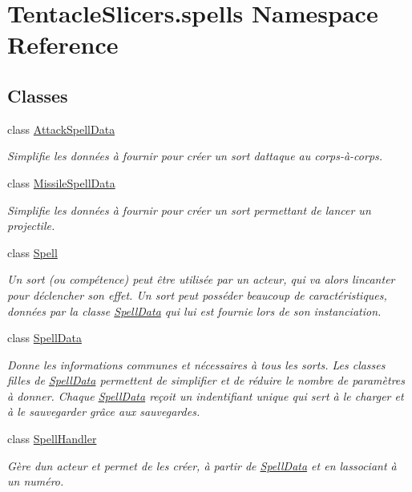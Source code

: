 \hypertarget{namespace_tentacle_slicers_1_1spells}{}\section{Tentacle\+Slicers.\+spells Namespace Reference}
\label{namespace_tentacle_slicers_1_1spells}
\subsection*{Classes}
\begin{DoxyCompactItemize}
\item 
class \hyperlink{class_tentacle_slicers_1_1spells_1_1_attack_spell_data}{Attack\+Spell\+Data}
\begin{DoxyCompactList}\small\item\em Simplifie les données à fournir pour créer un sort d\textquotesingle{}attaque au corps-\/à-\/corps. \end{DoxyCompactList}\item 
class \hyperlink{class_tentacle_slicers_1_1spells_1_1_missile_spell_data}{Missile\+Spell\+Data}
\begin{DoxyCompactList}\small\item\em Simplifie les données à fournir pour créer un sort permettant de lancer un projectile. \end{DoxyCompactList}\item 
class \hyperlink{class_tentacle_slicers_1_1spells_1_1_spell}{Spell}
\begin{DoxyCompactList}\small\item\em Un sort (ou compétence) peut être utilisée par un acteur, qui va alors l\textquotesingle{}incanter pour déclencher son effet. Un sort peut posséder beaucoup de caractéristiques, données par la classe \hyperlink{class_tentacle_slicers_1_1spells_1_1_spell_data}{Spell\+Data} qui lui est fournie lors de son instanciation. \end{DoxyCompactList}\item 
class \hyperlink{class_tentacle_slicers_1_1spells_1_1_spell_data}{Spell\+Data}
\begin{DoxyCompactList}\small\item\em Donne les informations communes et nécessaires à tous les sorts. Les classes filles de \hyperlink{class_tentacle_slicers_1_1spells_1_1_spell_data}{Spell\+Data} permettent de simplifier et de réduire le nombre de paramètres à donner. Chaque \hyperlink{class_tentacle_slicers_1_1spells_1_1_spell_data}{Spell\+Data} reçoit un indentifiant unique qui sert à le charger et à le sauvegarder grâce aux sauvegardes. \end{DoxyCompactList}\item 
class \hyperlink{class_tentacle_slicers_1_1spells_1_1_spell_handler}{Spell\+Handler}
\begin{DoxyCompactList}\small\item\em Gère d\textquotesingle{}un acteur et permet de les créer, à partir de \hyperlink{class_tentacle_slicers_1_1spells_1_1_spell_data}{Spell\+Data} et en l\textquotesingle{}associant à un numéro. \end{DoxyCompactList}\end{DoxyCompactItemize}
